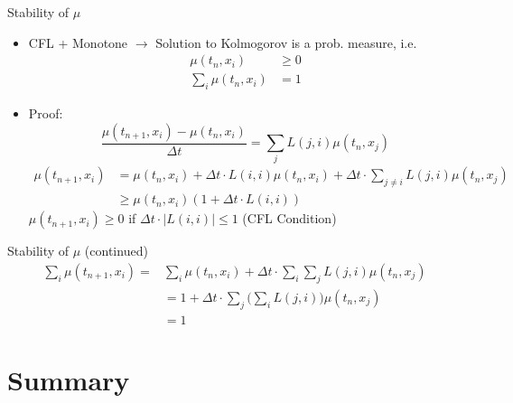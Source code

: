 \documentclass{beamer}
\begin{document}
	\begin{frame}{Stability of $\mu$}
		\begin{itemize}
			\item CFL + Monotone $\rightarrow$ Solution to Kolmogorov is a prob. measure, i.e.
			\begin{equation}
				\begin{split}
					\mu(t_n,x_i) & \geq 0 \\
					\sum_i \mu(t_n,x_i) &= 1
				\end{split}
			\end{equation}
			\item Proof:
			\begin{equation}
				\frac{\mu(t_{n+1},x_i)-\mu(t_{n},x_i)}{\Delta t}=\sum_{j} L(j,i) \mu(t_n,x_j)
			\end{equation}
			\begin{equation}
				\begin{split}
					\mu(t_{n+1},x_i)&=\mu(t_{n},x_i)+ \Delta t \cdot L(i,i)\mu(t_n,x_i) + \Delta t \cdot \sum_{j\neq i} L(j,i) \mu(t_n,x_j)  \\
					& \geq \mu(t_{n},x_i) (1+ \Delta t \cdot L(i,i))
				\end{split}
			\end{equation}
			$\mu(t_{n+1},x_i) \geq 0$ if $\Delta t \cdot| L(i,i)| \leq 1$ (CFL Condition)
		\end{itemize}
	\end{frame}
	
	\begin{frame}{Stability of $\mu$ (continued)}
		\begin{equation}
			\begin{split}
				\sum_i \mu(t_{n+1},x_i)=& \sum_i \mu(t_{n},x_i)+\Delta t \cdot \sum_i \sum_{j} L(j,i) \mu(t_n,x_j) \\
				& = 1 + \Delta t \cdot \sum_j \Big(\sum_i L(j,i)\Big) \mu(t_n,x_j) \\
				& = 1
			\end{split}
		\end{equation}
	\end{frame}
	
	\section*{Summary}
	
\end{document}
